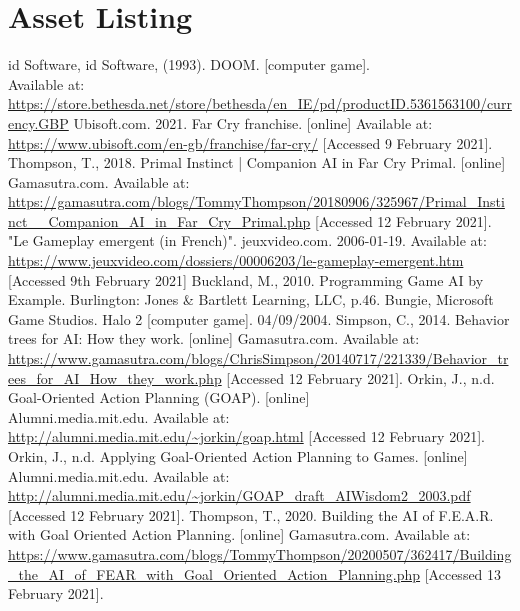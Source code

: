 \documentclass[11pt]{report}
\begin{document}
\chapter{Asset Listing}

\begin{thebibliography}{}
    id Software, id Software, (1993). DOOM. [computer game]. \\Available at: \url{https://store.bethesda.net/store/bethesda/en_IE/pd/productID.5361563100/currency.GBP}
    Ubisoft.com. 2021. Far Cry franchise. [online] Available at: \url{https://www.ubisoft.com/en-gb/franchise/far-cry/} [Accessed 9 February 2021].
    Thompson, T., 2018. Primal Instinct | Companion AI in Far Cry Primal. [online] Gamasutra.com. Available at: \url{https://gamasutra.com/blogs/TommyThompson/20180906/325967/Primal_Instinct__Companion_AI_in_Far_Cry_Primal.php} [Accessed 12 February 2021].
    "Le Gameplay emergent (in French)". jeuxvideo.com. 2006-01-19. Available at: \url{https://www.jeuxvideo.com/dossiers/00006203/le-gameplay-emergent.htm} [Accessed 9th February 2021]
    Buckland, M., 2010. Programming Game AI by Example. Burlington: Jones \& Bartlett Learning, LLC, p.46.
    Bungie, Microsoft Game Studios. Halo 2 [computer game]. 04/09/2004.
    Simpson, C., 2014. Behavior trees for AI: How they work. [online] Gamasutra.com. Available at: \url{https://www.gamasutra.com/blogs/ChrisSimpson/20140717/221339/Behavior_trees_for_AI_How_they_work.php} [Accessed 12 February 2021].
    Orkin, J., n.d. Goal-Oriented Action Planning (GOAP). [online] \\Alumni.media.mit.edu. Available at: \url{http://alumni.media.mit.edu/~jorkin/goap.html} [Accessed 12 February 2021].
    Orkin, J., n.d. Applying Goal-Oriented Action Planning to Games. [online] \\Alumni.media.mit.edu. Available at: \url{http://alumni.media.mit.edu/~jorkin/GOAP_draft_AIWisdom2_2003.pdf} [Accessed 12 February 2021].
    Thompson, T., 2020. Building the AI of F.E.A.R. with Goal Oriented Action Planning. [online] Gamasutra.com. Available at: \url{https://www.gamasutra.com/blogs/TommyThompson/20200507/362417/Building_the_AI_of_FEAR_with_Goal_Oriented_Action_Planning.php} [Accessed 13 February 2021].

\end{thebibliography}
\end{document}
